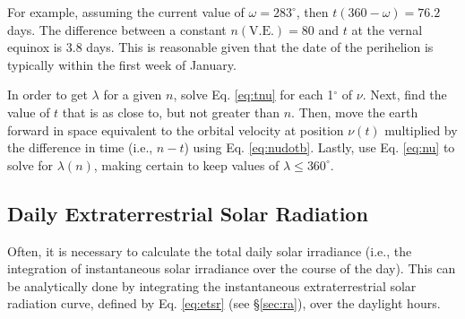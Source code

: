 For example, assuming the current value of $\omega = 283^{\circ}$, then $t(360-\omega) = 76.2$ days. 
The difference between a constant $n(\text{V.E.}) = 80$ and $t$ at the vernal equinox is 3.8 days. 
This is reasonable given that the date of the perihelion is typically within the first week of January. 

In order to get $\lambda$ for a given $n$, solve Eq. \ref{eq:tnu} for each 1$^{\circ}$ of $\nu$. 
Next, find the value of $t$ that is as close to, but not greater than $n$.   
Then, move the earth forward in space equivalent to the orbital velocity at position $\nu(t)$ multiplied by the difference in time (i.e., $n-t$) using Eq. \ref{eq:nudotb}. 
Lastly, use Eq. \ref{eq:nu} to solve for $\lambda(n)$, making certain to keep values of $\lambda \leq 360^{\circ}$.

\subsection{Daily Extraterrestrial Solar Radiation}
\label{sec:dra}
Often, it is necessary to calculate the total daily solar irradiance (i.e., the integration of instantaneous solar irradiance over the course of the day). 
This can be analytically done by integrating the instantaneous extraterrestrial solar radiation curve, defined by Eq. \ref{eq:etsr} (see \S \ref{sec:ra}), over the daylight hours. 

